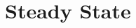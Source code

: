 \documentclass[12pt, bibtotoc, tablecaptionabove, figurecaptionabove, fleqn]{article}
\begin{document}
\section{Steady State}

%
%
%
%
%
%
%
%
\end{document}
